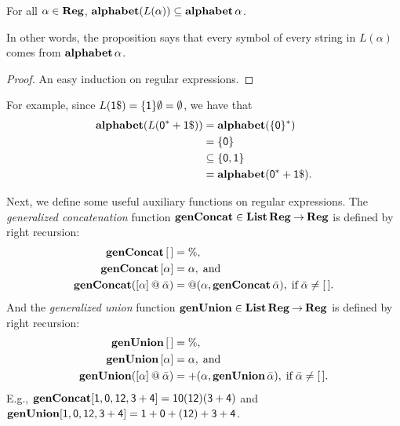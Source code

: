 \begin{proposition}
\label{AlphabetRegMeaning}
For all $\alpha\in\mathbf{Reg}$, $\mathbf{alphabet}(L(\alpha))\subseteq\mathbf{alphabet}\,\alpha$.
\end{proposition}

In other words, the proposition says that every symbol of every string in
$L(\alpha)$  comes from $\mathbf{alphabet}\,\alpha$.

\begin{proof}
An easy induction on regular expressions.
\end{proof}

For example, since $L(\mathsf{1}\$) = \{\mathsf{1}\}\emptyset = \emptyset$,
we have that
\begin{align*}
\mathbf{alphabet}(L(\mathsf{0^*+1\$})) &=
\mathbf{alphabet}(\{\mathsf{0}\}^*) \\
&= \{\mathsf{0}\} \\
&\subseteq \{\mathsf{0,1}\} \\
&= \mathbf{alphabet}(\mathsf{0^*+1\$}) .
\end{align*}

Next, we define some useful auxiliary functions on regular expressions.
The \emph{generalized concatenation} function
$\mathbf{genConcat}\in\mathbf{List}\,\mathbf{Reg}\mathbin{\to}\mathbf{Reg}$ is defined by right recursion:
\begin{align*}
\mathbf{genConcat}\,[\,] &= \% , \\
\mathbf{genConcat}\,[\alpha] &= \alpha , \;\allowbreak\mbox{and}\allowbreak\; \\
\mathbf{genConcat}([\alpha] \mathbin{@} \bar{\alpha}) &=
{@}(\alpha, \mathbf{genConcat}\,\bar{\alpha}) , \;\allowbreak\mbox{if}\allowbreak\; \bar{\alpha}\neq [\,] .
\end{align*}
And the \emph{generalized union} function
$\mathbf{genUnion}\in\mathbf{List}\,\mathbf{Reg}\mathbin{\to}\mathbf{Reg}$ is defined by right recursion:
\begin{align*}
\mathbf{genUnion}\,[\,] &= \% , \\
\mathbf{genUnion}\,[\alpha] &= \alpha , \;\allowbreak\mbox{and}\allowbreak\; \\
\mathbf{genUnion}([\alpha] \mathbin{@} \bar{\alpha}) &=
{+}(\alpha, \mathbf{genUnion}\,\bar{\alpha}) , \;\allowbreak\mbox{if}\allowbreak\; \bar{\alpha}\neq [\,] .
\end{align*}
E.g., $\mathbf{genConcat}[\mathsf{1, 0, 12, 3+4}] = \mathsf{10(12)(3+4)}$ and
$\mathbf{genUnion}[\mathsf{1, 0, 12, 3+4}] = \mathsf{1 + 0 + (12) + 3 + 4}$.

